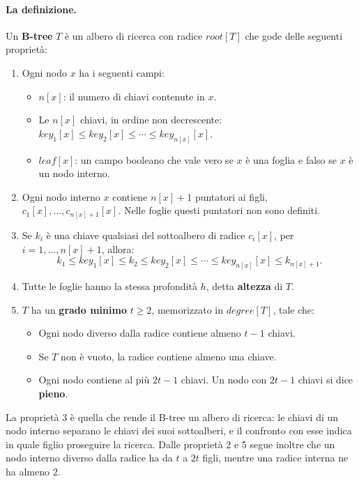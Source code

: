 \paragraph{La definizione.}
Un \textbf{B-tree} $T$ è un albero di ricerca con radice $\mathit{root}[T]$ che gode delle seguenti proprietà:
\begin{enumerate}
    \item Ogni nodo $x$ ha i seguenti campi:
    \begin{itemize}
        \item $n[x]$: il numero di chiavi contenute in $x$.
        \item Le $n[x]$ chiavi, in ordine non decrescente: $\mathit{key}_1[x] \le \mathit{key}_2[x] \le \cdots \le \mathit{key}_{n[x]}[x]$.
        \item $\mathit{leaf}[x]$: un campo booleano che vale vero se $x$ è una foglia e falso se $x$ è un nodo interno.
    \end{itemize}
    \item Ogni nodo interno $x$ contiene $n[x]+1$ puntatori ai figli, $c_1[x], \ldots, c_{n[x]+1}[x]$. Nelle foglie questi puntatori non sono definiti.
    \item Se $k_i$ è una chiave qualsiasi del sottoalbero di radice $c_i[x]$, per $i = 1, \ldots, n[x]+1$, allora:
    \[
    k_1 \le \mathit{key}_1[x] \le k_2 \le \mathit{key}_2[x] \le \cdots \le \mathit{key}_{n[x]}[x] \le k_{n[x]+1}.
    \]
    \item Tutte le foglie hanno la stessa profondità $h$, detta \textbf{altezza} di $T$.
    \item $T$ ha un \textbf{grado minimo} $t \ge 2$, memorizzato in $\mathit{degree}[T]$, tale che:
    \begin{itemize}
        \item Ogni nodo diverso dalla radice contiene almeno $t-1$ chiavi.
        \item Se $T$ non è vuoto, la radice contiene almeno una chiave.
        \item Ogni nodo contiene al più $2t-1$ chiavi. Un nodo con $2t-1$ chiavi si dice \textbf{pieno}.
    \end{itemize}
\end{enumerate}

La proprietà 3 è quella che rende il B-tree un albero di ricerca: le chiavi di un nodo interno separano le chiavi dei suoi sottoalberi, e il confronto con esse indica in quale figlio proseguire la ricerca. Dalle proprietà 2 e 5 segue inoltre che un nodo interno diverso dalla radice ha da $t$ a $2t$ figli, mentre una radice interna ne ha almeno $2$.

